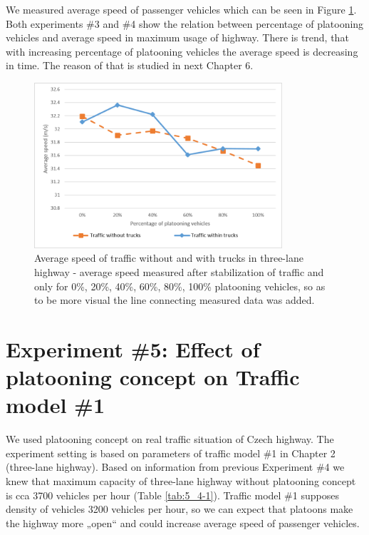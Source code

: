 We measured average speed of passenger vehicles which can be seen in Figure \ref{fig:5_4-4}. Both experiments \#3 and \#4 show the relation between percentage of platooning vehicles and average speed in maximum usage of highway.  There is trend, that with increasing percentage of platooning vehicles the average speed is decreasing in time. The reason of that is studied in next Chapter 6.

\begin{figure}[!htbp]
\centering
\includegraphics[width=0.82\textwidth,height=0.82\textheight,keepaspectratio]{figures/Chapter_5/5_E4_averageSpeed.png}
\centering
\protect\caption[Average speed of traffic without and with trucks in three-lane highway]{\label{fig:5_4-4}Average speed of traffic without and with trucks in three-lane highway - average speed measured after stabilization of traffic and only for 0\%, 20\%, 40\%, 60\%, 80\%, 100\% platooning vehicles, so as to be more visual the line connecting measured data was added.}
\end{figure}















\newpage
\section[Experiment \#5: Effect of platooning concept on Traffic model \#1 ]{Experiment \#5: Effect of platooning concept on Traffic model \#1}

We used platooning concept on real traffic situation of Czech highway. The experiment setting is based on parameters of traffic model \#1 in Chapter 2 (three-lane highway). Based on information from previous Experiment \#4 we knew that maximum capacity of three-lane highway without platooning concept is cca 3700 vehicles per hour (Table \ref{tab:5_4-1}). Traffic model \#1 supposes density of vehicles 3200 vehicles per hour, so we can expect that platoons make the highway more „open“ and could increase average speed of passenger vehicles.


